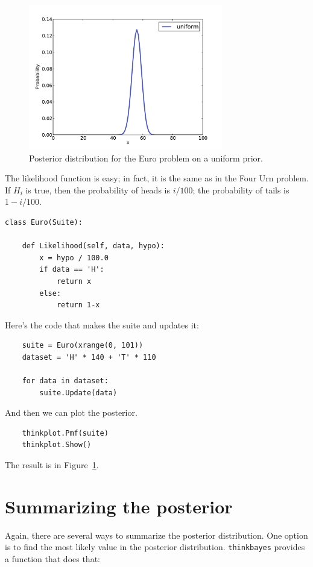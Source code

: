 \documentclass[12pt]{book}
\begin{document}
\begin{figure}
\centerline{\includegraphics[height=2.5in]{figs/euro1.pdf}}
\caption{Posterior distribution for the Euro problem
on a uniform prior.}
\label{fig.euro1}
\end{figure}

The likelihood function is easy; in fact, it is the same as in
the Four Urn problem.  If $H_i$ is true, then the probability of
heads is $i/100$; the probability of tails is $1- i/100$.

\begin{verbatim}
class Euro(Suite):

    def Likelihood(self, data, hypo):
        x = hypo / 100.0
        if data == 'H':
            return x
        else:
            return 1-x
\end{verbatim}

Here's the code that makes the suite and updates it:

\begin{verbatim}
    suite = Euro(xrange(0, 101))
    dataset = 'H' * 140 + 'T' * 110

    for data in dataset:
        suite.Update(data)
\end{verbatim}

And then we can plot the posterior.

\begin{verbatim}
    thinkplot.Pmf(suite)
    thinkplot.Show()
\end{verbatim}

The result is in Figure~\ref{fig.euro1}.


\section{Summarizing the posterior}

Again, there are several ways to summarize the posterior distribution.
One option is to find the most likely value in the posterior
distribution.  \verb"thinkbayes" provides a function that does 
that:
\end{document}
